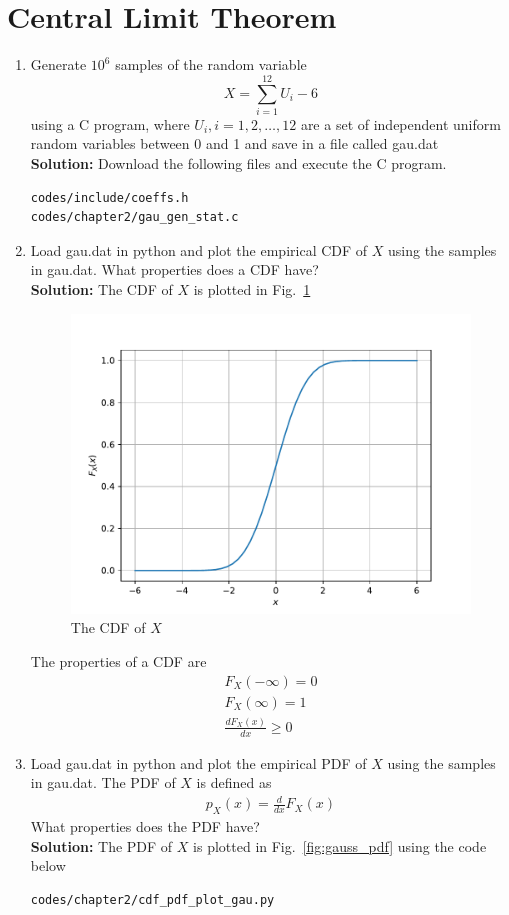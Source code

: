 \documentclass[journal,10pt,twocolumn]{IEEEtran}
\newcommand\figref{Fig.~\ref}
\newcommand{\solution}{\noindent \textbf{Solution: }}
\begin{document}
\section{Central Limit Theorem}
\begin{enumerate}
%
%
\item
Generate $10^6$ samples of the random variable
%
\begin{equation}
X = \sum_{i=1}^{12}U_i -6
\end{equation}
%
using a C program, where $U_i, i = 1,2,\dots, 12$ are  a set of independent uniform random variables between 0 and 1
and save in a file called gau.dat\\
\solution Download the following files and execute the  C program.
\begin{lstlisting}
codes/include/coeffs.h
codes/chapter2/gau_gen_stat.c
\end{lstlisting}
%
\item
Load gau.dat in python and plot the empirical CDF of $X$ using the samples in gau.dat. What properties does a CDF have?
\\
\solution The CDF of $X$ is plotted in \figref{fig:gauss_cdf}
\begin{figure}[H]
\centering
\includegraphics[width=\columnwidth]{./figs/chapter2/gau_cdf.pdf}
\caption{The CDF of $X$}
\label{fig:gauss_cdf}
\end{figure}
The properties of a CDF are
\begin{eqnarray}
	F_X(-\infty) = 0\\
	F_X(\infty) = 1\\
	\frac{dF_X(x)}{dx} \ge 0
\end{eqnarray}
\item
Load gau.dat in python and plot the empirical PDF of $X$ using the samples in gau.dat. The PDF of $X$ is defined as
\begin{align}
p_{X}(x) = \frac{d}{dx}F_{X}(x)
\label{eq:cdf_to_pdf}
\end{align}
What properties does the PDF have?
\\
\solution The PDF of $X$ is plotted in \figref{fig:gauss_pdf} using the code below
\begin{lstlisting}
codes/chapter2/cdf_pdf_plot_gau.py
\end{lstlisting}


\end{enumerate}
\end{document}
